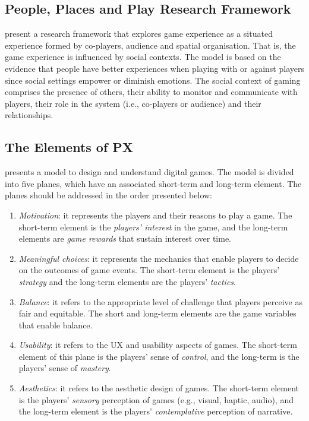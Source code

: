 \subsection{People, Places and Play Research Framework}
\textcite{DeKort2007b} present a research framework that explores game experience as a situated experience formed by co-players, audience and spatial organisation. That is, the game experience is influenced by social contexts. The model is based on the evidence that people have better experiences when playing with or against players since social settings empower or diminish emotions. The social context of gaming comprises the presence of others, their ability to monitor and communicate with players, their role in the system (i.e., co-players or audience) and their relationships.



\subsection{The Elements of \ac{PX}}

\textcite{Ferrara} presents a model to design and understand digital games. The model is divided into five planes, which have an associated short-term and long-term element. The planes should be addressed in the order presented below:

\begin{enumerate}
    \item \emph{Motivation}: it represents the players and their reasons to play a game. The short-term element is the \textit{players' interest} in the game, and the long-term elements are \textit{game rewards} that sustain interest over time.
    \item \emph{Meaningful choices}: it represents the mechanics that enable players to decide on the outcomes of game events. The short-term element is the players' \textit{strategy} and the long-term elements are the players' \textit{tactics}.
    \item \emph{Balance}: it refers to the appropriate level of challenge that players perceive as fair and equitable. The short and long-term elements are the game variables that enable balance.
    \item \emph{Usability}: it refers to the \ac{UX} and usability aspects of games. The short-term element of this plane is the players' sense of \textit{control}, and the long-term is the players' sense of \textit{mastery}.
    \item \emph{Aesthetics}: it refers to the aesthetic design of games. The short-term element is the players' \textit{sensory} perception of games (e.g., visual, haptic, audio), and the long-term element is the players' \textit{contemplative} perception of narrative.
\end{enumerate}

